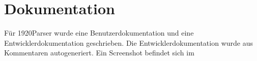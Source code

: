 \section{Dokumentation}
\label{sec:Dokumentation}
Für 1920Parser wurde eine Benutzerdokumentation und eine Entwicklerdokumentation geschrieben. Die Entwicklerdokumentation wurde aus Kommentaren autogeneriert. Ein Screenshot befindet sich im 

